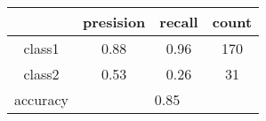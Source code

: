 
    \begin{tabular}{ | c | c | c | c | }
	\hline
	 & presision & recall & count \\ \hline
	class1 & 0.88 & 0.96 & 170 \\ \hline
	class2 & 0.53 & 0.26 & 31  \\ \hline
	\hline
	accuracy & \multicolumn{3}{c|}{0.85} \\
	\hline
    \end{tabular}
